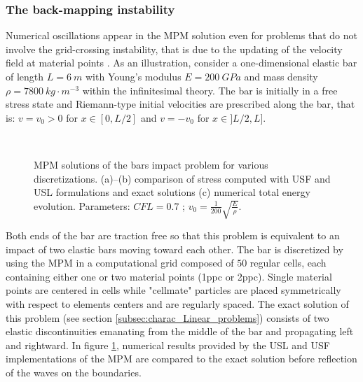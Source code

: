 \subsubsection*{The back-mapping instability}
Numerical oscillations appear in the MPM solution even for problems that do not involve the grid-crossing instability, that is due to the updating of the velocity field at material points \cite{Mass_Flip}. As an illustration, consider a one-dimensional elastic bar of length $L=6\:m$ with Young's modulus $E=200 \:GPa$ and mass density $\rho=7800 \:kg\cdot m^{-3}$ within the infinitesimal theory. The bar is initially in a free stress state and Riemann-type initial velocities are prescribed along the bar, that is: $v=v_0>0$ for $x\in[0,L/2]$ and $v=-v_0$ for $x \in ]L/2,L]$.
\begin{figure}[ht]
  \centering
  {  \label{subfig:US_diffusion_10}}
  {  \label{subfig:US_diffusion_25}}\\
  {  \label{subfig:US_energies}}
  \caption{MPM solutions of the bars impact problem for various discretizations. (a)--(b) comparison of stress computed with USF and USL formulations and exact solutions (c) numerical total energy evolution. Parameters: $CFL=0.7$ ; $v_0=\frac{1}{200}\sqrt{\frac{E}{\rho}}$.}
  \label{fig:US_diffusion}
\end{figure}
Both ends of the bar are traction free so that this problem is equivalent to an impact of two elastic bars moving toward each other. The bar is discretized by using the MPM in a computational grid composed of $50$ regular cells, each containing either one or two material points (1ppc or 2ppc). Single material points are centered in cells while "cellmate" particles are placed symmetrically with respect to elements centers and are regularly spaced. The exact solution of this problem (see section \ref{subsec:charac_Linear_problems}) consists of two elastic discontinuities emanating from the middle of the bar and propagating left and rightward. In figure \ref{fig:US_diffusion}, numerical results provided by the USL and USF implementations of the MPM are compared to the exact solution before reflection of the waves on the boundaries. 


